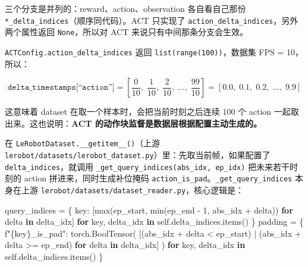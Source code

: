 \documentclass[
  chinese,
]{ctexart}
\newenvironment{Shaded}{\begin{snugshade}}{\end{snugshade}}
\newcommand{\BuiltInTok}[1]{\textcolor[rgb]{0.00,0.23,0.31}{#1}}
\newcommand{\ControlFlowTok}[1]{\textcolor[rgb]{0.00,0.23,0.31}{\textbf{#1}}}
\newcommand{\DecValTok}[1]{\textcolor[rgb]{0.68,0.00,0.00}{#1}}
\newcommand{\KeywordTok}[1]{\textcolor[rgb]{0.00,0.23,0.31}{\textbf{#1}}}
\newcommand{\NormalTok}[1]{\textcolor[rgb]{0.00,0.23,0.31}{#1}}
\newcommand{\OperatorTok}[1]{\textcolor[rgb]{0.37,0.37,0.37}{#1}}
\newcommand{\SpecialCharTok}[1]{\textcolor[rgb]{0.37,0.37,0.37}{#1}}
\newcommand{\SpecialStringTok}[1]{\textcolor[rgb]{0.13,0.47,0.30}{#1}}
\newcommand{\VariableTok}[1]{\textcolor[rgb]{0.07,0.07,0.07}{#1}}
\begin{document}
三个分支是并列的：reward、action、observation 各自看自己那份
\texttt{*\_delta\_indices}（顺序同代码）。ACT 只实现了
\texttt{action\_delta\_indices}，另外两个属性返回 \texttt{None}，所以对
ACT 来说只有中间那条分支会生效。

\texttt{ACTConfig.action\_delta\_indices} 返回
\texttt{list(range(100))}，数据集 FPS = 10，所以：

\[
\texttt{delta\_timestamps[“action”]} = \left[\frac{0}{10},\; \frac{1}{10},\; \frac{2}{10},\; \ldots,\; \frac{99}{10}\right] = [0.0,\; 0.1,\; 0.2,\; \ldots,\; 9.9]
\]

这意味着 dataset 在取一个样本时，会把当前时刻之后连续 100 个 action
一起取出来。这也说明：\textbf{ACT
的动作块监督是数据层根据配置主动生成的。}

在 \texttt{LeRobotDataset.\_\_getitem\_\_()}（上游
\texttt{lerobot/datasets/lerobot\_dataset.py}）里：先取当前帧，如果配置了
\texttt{delta\_indices}，就调用
\texttt{\_get\_query\_indices(abs\_idx,\ ep\_idx)} 把未来若干时刻的
action 拼进来，同时生成补位掩码
\texttt{action\_is\_pad}。\texttt{\_get\_query\_indices} 本身在上游
\texttt{lerobot/datasets/dataset\_reader.py}，核心逻辑是：

\begin{Shaded}
\begin{Highlighting}[]
\NormalTok{        query\_indices }\OperatorTok{=}\NormalTok{ \{}
\NormalTok{            key: [}\BuiltInTok{max}\NormalTok{(ep\_start, }\BuiltInTok{min}\NormalTok{(ep\_end }\OperatorTok{{-}} \DecValTok{1}\NormalTok{, abs\_idx }\OperatorTok{+}\NormalTok{ delta)) }\ControlFlowTok{for}\NormalTok{ delta }\KeywordTok{in}\NormalTok{ delta\_idx]}
            \ControlFlowTok{for}\NormalTok{ key, delta\_idx }\KeywordTok{in} \VariableTok{self}\NormalTok{.delta\_indices.items()}
\NormalTok{        \}}
\NormalTok{        padding }\OperatorTok{=}\NormalTok{ \{}
            \SpecialStringTok{f"}\SpecialCharTok{\{}\NormalTok{key}\SpecialCharTok{\}}\SpecialStringTok{\_is\_pad"}\NormalTok{: torch.BoolTensor(}
\NormalTok{                [(abs\_idx }\OperatorTok{+}\NormalTok{ delta }\OperatorTok{\textless{}}\NormalTok{ ep\_start) }\OperatorTok{|}\NormalTok{ (abs\_idx }\OperatorTok{+}\NormalTok{ delta }\OperatorTok{\textgreater{}=}\NormalTok{ ep\_end) }\ControlFlowTok{for}\NormalTok{ delta }\KeywordTok{in}\NormalTok{ delta\_idx]}
\NormalTok{            )}
            \ControlFlowTok{for}\NormalTok{ key, delta\_idx }\KeywordTok{in} \VariableTok{self}\NormalTok{.delta\_indices.items()}
\NormalTok{        \}}
\end{Highlighting}
\end{Shaded}
\end{document}
